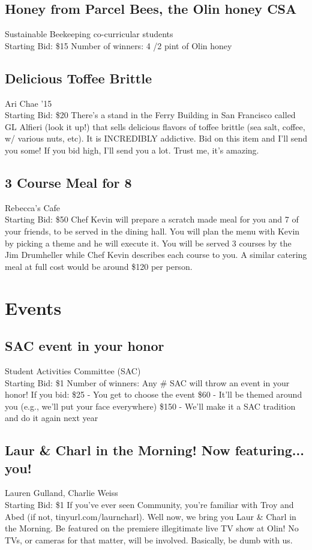 \documentclass[11pt]{article}
\begin{document}
\subsection{Honey from Parcel Bees, the Olin honey CSA}
Sustainable Beekeeping co-curricular students
\\
Starting Bid: \$15
\newline
Number of winners: 4
/2 pint of Olin honey
\subsection{Delicious Toffee Brittle}
Ari Chae '15
\\
Starting Bid: \$20
\newline
There's a stand in the Ferry Building in San Francisco called GL Alfieri (look it up!) that sells delicious flavors of toffee brittle (sea salt, coffee, w/ various nuts, etc). It is INCREDIBLY addictive. Bid on this item and I'll send you some! If you bid high, I'll send you a lot. Trust me, it's amazing.
\subsection{3 Course Meal for 8}
Rebecca's Cafe
\\
Starting Bid: \$50
\newline
Chef Kevin will prepare a scratch made meal for you and 7 of your friends, to be served in the dining hall. You will plan the menu with Kevin by picking a theme and he will execute it. You will be served 3 courses by the Jim Drumheller while Chef Kevin describes each course to you. A similar catering meal at full cost would be around \$120 per person.
\section{Events}
\subsection{SAC event in your honor}
Student Activities Committee (SAC)
\\
Starting Bid: \$1
\newline
Number of winners: Any \#
\newline
SAC will throw an event in your honor! If you bid:
\$25 - You get to choose the event
\$60 - It'll be themed around you (e.g., we'll put your face everywhere)
\$150 - We'll make it a SAC tradition and do it again next year
\subsection{Laur \& Charl in the Morning! Now featuring... you!}
Lauren Gulland, Charlie Weiss
\\
Starting Bid: \$1
\newline
If you've ever seen Community, you're familiar with Troy and Abed (if not, tinyurl.com/laurncharl). Well now, we bring you Laur \& Charl in the Morning. Be featured on the premiere illegitimate live TV show at Olin! No TVs, or cameras for that matter, will be involved. Basically, be dumb with us.
\end{document}
